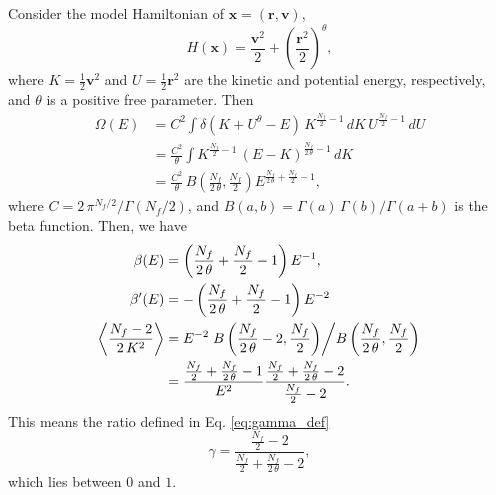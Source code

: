 \documentclass[reprint]{revtex4-1}
\begin{document}
Consider the model Hamiltonian of $\mathbf x = (\mathbf r, \mathbf v)$,
\begin{equation}
  H(\mathbf x)
  =
  \frac{\mathbf v^2} { 2 }
  +
  \left( \frac{\mathbf r^2} { 2 } \right)^\theta
  ,
\end{equation}
%
where $K = \frac 1 2 {\mathbf v}^2$ and
$U = \frac 1 2 {\mathbf r}^2$
are the kinetic and potential energy, respectively,
and $\theta$ is a positive free parameter.
Then
\begin{align*}
  \Omega(E)
  &=
  C^2
  \int
    \delta\left( K + U^\theta - E \right) \,
    K^{\frac{ N_f } 2 - 1} \, dK \, U^{\frac{ N_f } 2 - 1} \, dU
  \\
  &=
  \frac{ C^2 } { \theta }
  \int
  K^{\frac{ N_f } 2 - 1} \, (E - K)^{\frac{ N_f }{ 2 \, \theta } - 1}
    \, dK
  \\
  &=
  \frac{ C^2 }{ \theta } \,
  B\left( \frac{ N_f } {2 \, \theta}, \frac{ N_f } 2 \right)
  E^{ \frac{ N_f }{2 \, \theta} + \frac{N_f}{2} - 1 }
  ,
\end{align*}
where
%
$C = 2 \, \pi^{N_f/2} / \Gamma\left( N_f / 2 \right)$,
and
$B(a, b) = \Gamma(a) \, \Gamma(b) / \Gamma(a+b)$
is the beta function.
%
Then, we have
\begin{align*}
\beta(E)
&=
\left(
  \frac{ N_f } { 2 \, \theta } + \frac{ N_f } 2 - 1
\right)
E^{-1}
,
\\
\beta'(E)
&=
-
\left(
  \frac{ N_f } { 2 \, \theta } + \frac{ N_f } 2 - 1
\right)
E^{-2}
\\
\left\langle
  \frac{
    N_f - 2
  }
  {
    2 \, K^2
  }
\right\rangle
&=
  E^{-2}
\left.
  B\left( \frac{ N_f } { 2  \, \theta } - 2, \frac{ N_f } { 2 } \right)
\middle/
  B\left( \frac{ N_f } { 2  \, \theta }, \frac{ N_f } { 2 } \right)
\right.
\\
&=
\frac{ \frac{ N_f } 2 + \frac{ N_f }{2 \, \theta} - 1 }
     { E^2 }
\frac{ \frac{ N_f } 2 + \frac{ N_f }{2 \, \theta} - 2 }
     { \frac{ N_f } 2 - 2 }
.
\end{align*}
This means the ratio defined in Eq. \eqref{eq:gamma_def}
$$
\gamma
=
\frac
{
  \frac{ N_f } 2 - 2
}
{
  \frac{ N_f } 2 + \frac{N_f}{2 \, \theta} - 2
}
,
$$
which lies between $0$ and $1$.

%

\end{document}
